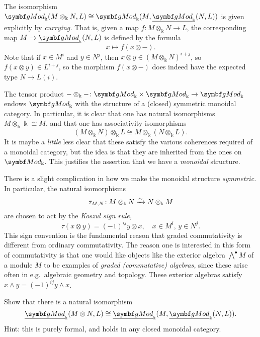 \begin{remark}
	The isomorphism \(\gMod_\Bbbk(M\otimes_\Bbbk N,L) \cong \gMod_\Bbbk(M,\ugMod_\Bbbk(N,L))\) is given explicitly by \emph{currying.} That is,
	given a map \(f\!:M\otimes_\Bbbk N \to L\), the corresponding map \(M \to \ugMod_\Bbbk(N,L)\) is defined by the formula
	\[ x \mapsto f(x\otimes-). \]
	Note that if \(x\in M^i\) and \(y\in N^j\), then \(x\otimes y \in (M\otimes_\Bbbk N)^{i+j}\), so \(f(x\otimes y) \in L^{i+j}\), so the morphism
	\(f(x\otimes-)\) does indeed have the expected type \(N \to L(i)\).
\end{remark}

The tensor product \(-\otimes_\Bbbk-\!:\gMod_\Bbbk\times\gMod_\Bbbk\to\gMod_\Bbbk\) endows \(\gMod_\Bbbk\) with the structure
of a (closed) symmetric monoidal category. In particular, it is clear that one has natural isomorphisms \(M\otimes_\Bbbk \Bbbk \cong M\),
and that one has associativity isomorphisms
\[ (M\otimes_\Bbbk N)\otimes_\Bbbk L \cong M\otimes_\Bbbk (N\otimes_\Bbbk L). \]
It is maybe a \emph{little} less clear that these satisfy the various coherences required of a monoidal category, but the idea is that
they are inherited from the ones on \(\Mod_\Bbbk\). This justifies the assertion that we have a \emph{monoidal} structure.

There is a slight complication in how we make the monoidal structure \emph{symmetric.} In particular, the natural isomorphisms
\[ \tau_{M,N}\!: M\otimes_\Bbbk N \xrightarrow{\sim} N\otimes_\Bbbk M \]
are chosen to act by the \emph{Koszul sign rule,}
\[ \tau(x\otimes y) = (-1)^{ij} y\otimes x, \quad x\in M^i,\, y\in N^j. \]
This sign convention is the fundamental reason that graded commutativity is different from ordinary commutativity. The reason one is
interested in this form of commutativity is that one would like objects like the exterior algebra \(\bigwedge^\bullet M\) of a module
\(M\) to be examples of \emph{graded (commutative) algebras,} since these arise often in e.g.\ algebraic geometry and topology. These
exterior algebras satisfy \(x\wedge y = (-1)^{ij}y\wedge x\).

\begin{exercise}
	Show that there is a natural isomorphism
	\[ \ugMod_\Bbbk(M\otimes N,L) \cong \ugMod_\Bbbk(M,\ugMod_\Bbbk(N,L)). \]
	Hint: this is purely formal, and holds in any closed monoidal category.
\end{exercise}

